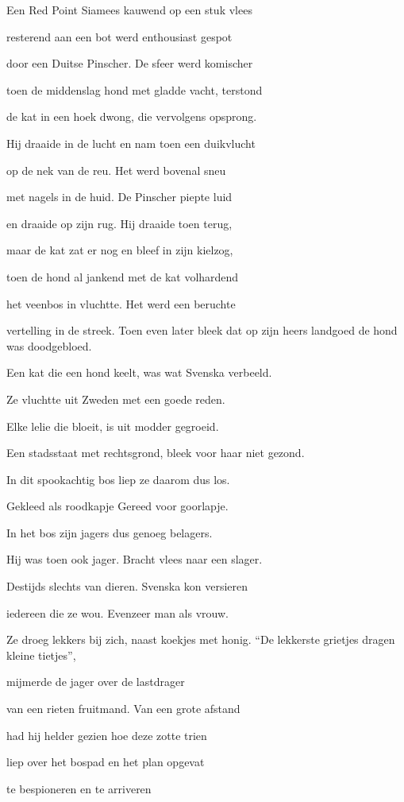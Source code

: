 Een Red Point Siamees
kauwend op een stuk vlees

resterend aan een bot
werd enthousiast gespot

door een Duitse Pinscher.
De sfeer werd komischer

toen de middenslag hond
met gladde vacht, terstond

de kat in een hoek dwong,
die vervolgens opsprong.

Hij draaide in de lucht
en nam toen een duikvlucht

op de nek van de reu.
Het werd bovenal sneu

met nagels in de huid.
De Pinscher piepte luid

en draaide op zijn rug.
Hij draaide toen terug,

maar de kat zat er nog
en bleef in zijn kielzog,

toen de hond al jankend
met de kat volhardend

het veenbos in vluchtte.
Het werd een beruchte

vertelling in de streek.
Toen even later bleek
dat op zijn heers landgoed
de hond was doodgebloed.

Een kat die een hond keelt,
was wat Svenska verbeeld.

Ze vluchtte uit Zweden
met een goede reden.

Elke lelie die bloeit,
is uit modder gegroeid.

Een stadsstaat met rechtsgrond,
bleek voor haar niet gezond.

In dit spookachtig bos
liep ze daarom dus los.

Gekleed als roodkapje
Gereed voor goorlapje.

In het bos zijn jagers
dus genoeg belagers.

Hij was toen ook jager.
Bracht vlees naar een slager.

Destijds slechts van dieren.
Svenska kon versieren

iedereen die ze wou.
Evenzeer man als vrouw.

Ze droeg lekkers bij zich,
naast koekjes met honig.
“De lekkerste grietjes
dragen kleine tietjes”,

mijmerde de jager
over de lastdrager

van een rieten fruitmand.
Van een grote afstand

had hij helder gezien
hoe deze zotte trien

liep over het bospad
en het plan opgevat

te bespioneren
en te arriveren

